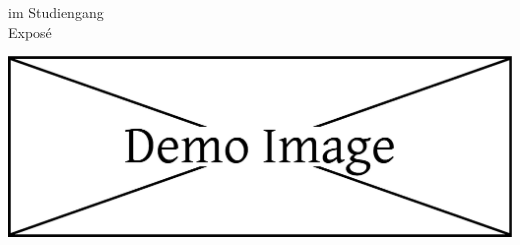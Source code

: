 \documentclass[
	a4paper,	%
	12pt,		%
]{report}
\begin{document}
	\begin{minipage}{0.7\textwidth}
		\Large
		\metadataType{} im Studiengang \metadataCourse \\
		Exposé
	\end{minipage}
	\begin{minipage}{0.29\textwidth}
		\flushright \includegraphics[width=\textwidth]{images/hfu_logo.eps}
	\end{minipage}
	
	
	\markboth{\bibname}{}
\end{document}
